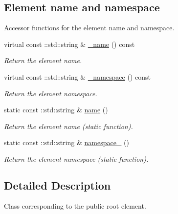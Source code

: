 \subsection*{Element name and namespace}
\label{_amgrpd4b5b61f6e07390f4af2465e04571f34}
Accessor functions for the element name and namespace. \begin{DoxyCompactItemize}
\item 
virtual const ::std::string \& \hyperlink{classopenstack_1_1xml_1_1Public_aa80f400ba2820037e08ec629503fa467}{\_\-name} () const 
\begin{DoxyCompactList}\small\item\em Return the element name. \item\end{DoxyCompactList}\item 
virtual const ::std::string \& \hyperlink{classopenstack_1_1xml_1_1Public_a2f03e0d96d80e6402641152cb160f865}{\_\-namespace} () const 
\begin{DoxyCompactList}\small\item\em Return the element namespace. \item\end{DoxyCompactList}\item 
static const ::std::string \& \hyperlink{classopenstack_1_1xml_1_1Public_af3932b855e538358a6b1010dca0a13f4}{name} ()
\begin{DoxyCompactList}\small\item\em Return the element name (static function). \item\end{DoxyCompactList}\item 
static const ::std::string \& \hyperlink{classopenstack_1_1xml_1_1Public_a1582b2212b7b89875bbf23597d6d17a1}{namespace\_\-} ()
\begin{DoxyCompactList}\small\item\em Return the element namespace (static function). \item\end{DoxyCompactList}\end{DoxyCompactItemize}


\subsection{Detailed Description}
Class corresponding to the public root element. 

